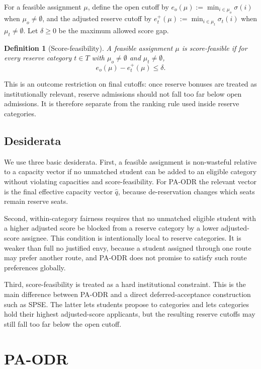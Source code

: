 \documentclass[a4paper,twoside]{article}
\newtheorem{definition}{Definition}
\begin{document}
For a feasible assignment $\mu$, define the open cutoff by $e_o(\mu):=\min_{i\in\mu_o}\sigma(i)$ when $\mu_o\neq\emptyset$, and the adjusted reserve cutoff by $e_t^+(\mu):=\min_{i\in\mu_t}\sigma_t(i)$ when $\mu_t\neq\emptyset$. Let $\delta\ge 0$ be the maximum allowed score gap.

\begin{definition}[Score-feasibility]
\label{def:paodr-score-feasibility}
A feasible assignment $\mu$ is score-feasible if for every reserve category $t\in T$ with $\mu_o\neq\emptyset$ and $\mu_t\neq\emptyset$,
\[
e_o(\mu)-e_t^+(\mu)\le \delta.
\]
\end{definition}

This is an outcome restriction on final cutoffs: once reserve bonuses are treated as institutionally relevant, reserve admissions should not fall too far below open admissions. It is therefore separate from the ranking rule used inside reserve categories.

\subsection{Desiderata}

We use three basic desiderata. First, a feasible assignment is non-wasteful relative to a capacity vector if no unmatched student can be added to an eligible category without violating capacities and score-feasibility. For PA-ODR the relevant vector is the final effective capacity vector $\hat q$, because de-reservation changes which seats remain reserve seats.

Second, within-category fairness requires that no unmatched eligible student with a higher adjusted score be blocked from a reserve category by a lower adjusted-score assignee. This condition is intentionally local to reserve categories. It is weaker than full no justified envy, because a student assigned through one route may prefer another route, and PA-ODR does not promise to satisfy such route preferences globally.

Third, score-feasibility is treated as a hard institutional constraint. This is the main difference between PA-ODR and a direct deferred-acceptance construction such as SPSE. The latter lets students propose to categories and lets categories hold their highest adjusted-score applicants, but the resulting reserve cutoffs may still fall too far below the open cutoff.

\section{\uppercase{PA-ODR}}
\end{document}
